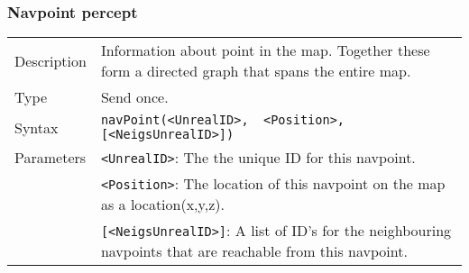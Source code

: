 \documentclass[11pt,a4paper]{article}
\begin{document}
\subsubsection*{Navpoint percept}
\begin{small}
\begin{tabular}{p{2cm}p{9cm}}
Description & Information about point in the map. Together these form a directed graph that spans the entire map.\\
Type & Send once.\\
Syntax & \verb|navPoint(<UnrealID>,  <Position>, [<NeigsUnrealID>])|\\
Parameters & \verb|<UnrealID>|: The the unique ID for this navpoint.\\
& \verb|<Position>|: The location of this navpoint on the map as a location(x,y,z).\\
& \verb|[<NeigsUnrealID>]|: A list of ID's for the neighbouring navpoints that are reachable from this navpoint.
\end{tabular}
\end{small}
\end{document}
